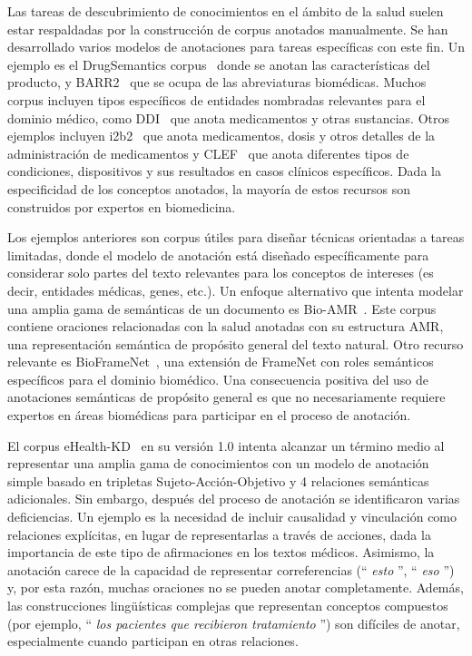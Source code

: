 Las tareas de descubrimiento de conocimientos en el ámbito de la salud suelen estar respaldadas por la construcción de corpus anotados manualmente.
Se han desarrollado varios modelos de anotaciones para tareas específicas con este fin. Un ejemplo es el {DrugSemantics} corpus~\cite{moreno2017drugsemantics} donde se anotan las características del producto, y {BARR2}~\cite{barr2} que se ocupa de las abreviaturas biomédicas.
Muchos corpus incluyen tipos específicos de entidades nombradas relevantes para el dominio médico, como {DDI}~\cite{ddi} que anota medicamentos y otras sustancias.
Otros ejemplos incluyen {i2b2}~\cite{i2b2} que anota medicamentos, dosis y otros detalles de la administración de medicamentos y {CLEF}~\cite{clef} que anota diferentes tipos de condiciones, dispositivos y sus resultados en casos clínicos específicos.
Dada la especificidad de los conceptos anotados, la mayoría de estos recursos son construidos por expertos en biomedicina.

Los ejemplos anteriores son corpus útiles para diseñar técnicas orientadas a tareas limitadas,
donde el modelo de anotación está diseñado específicamente para considerar solo partes del texto relevantes para los conceptos de intereses (es decir, entidades médicas, genes, etc.).
Un enfoque alternativo que intenta modelar una amplia gama de semánticas de un documento es {Bio-AMR}~\cite{bioamr}.
Este corpus contiene oraciones relacionadas con la salud anotadas con su estructura AMR, una representación semántica de propósito general del texto natural.
Otro recurso relevante es BioFrameNet~\cite{bioframenet}, una extensión de FrameNet con roles semánticos específicos para el dominio biomédico.
Una consecuencia positiva del uso de anotaciones semánticas de propósito general es que no necesariamente requiere expertos en áreas biomédicas para participar en el proceso de anotación.

El corpus {eHealth-KD}~\cite{martinez2018overview} en su versión 1.0 intenta alcanzar un término medio al representar una amplia gama de conocimientos con un modelo de anotación simple basado en tripletas Sujeto-Acción-Objetivo y 4 relaciones semánticas adicionales.
Sin embargo, después del proceso de anotación se identificaron varias deficiencias.
Un ejemplo es la necesidad de incluir {causalidad} y {vinculación} como relaciones explícitas, en lugar de representarlas a través de acciones, dada la importancia de este tipo de afirmaciones en los textos médicos.
Asimismo, la anotación carece de la capacidad de representar correferencias (`` \textit{esto} '', `` \textit{eso} '') y, por esta razón, muchas oraciones no se pueden anotar completamente.
Además, las construcciones lingüísticas complejas que representan conceptos compuestos (por ejemplo, `` \textit{los pacientes que recibieron tratamiento} '') son difíciles de anotar, especialmente cuando participan en otras relaciones.

